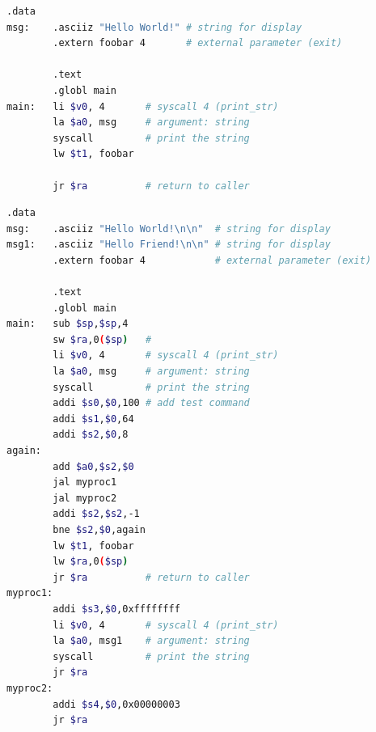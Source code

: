 \documentclass[11pt]{SEU-Digital-Report}
\begin{document}
      \begin{lstlisting}[language=sh,tabsize=4,morekeywords={
        j,la,li,syscall,move,sll,sub,bge,sll,add,sw,addi,jal,ls,subu,jr,lw,bgt,bne
      },title={HelloWorld.s}]
        .data
msg:    .asciiz "Hello World!" # string for display
        .extern foobar 4       # external parameter (exit)

        .text
        .globl main
main:   li $v0, 4       # syscall 4 (print_str)
        la $a0, msg     # argument: string
        syscall         # print the string
        lw $t1, foobar
        
        jr $ra          # return to caller
      \end{lstlisting}

            \begin{lstlisting}[language=sh,tabsize=4,morekeywords={
        j,la,li,syscall,move,sll,sub,bge,sll,add,sw,addi,jal,ls,subu,jr,lw,bgt,bne,lbu,lb,sb
      },title={HelloWorld2.s}]
        .data
msg:    .asciiz "Hello World!\n\n"  # string for display
msg1:   .asciiz "Hello Friend!\n\n" # string for display
        .extern foobar 4            # external parameter (exit)

        .text
        .globl main
main:   sub $sp,$sp,4
        sw $ra,0($sp)   #
        li $v0, 4       # syscall 4 (print_str)
        la $a0, msg     # argument: string
        syscall         # print the string
        addi $s0,$0,100 # add test command
        addi $s1,$0,64
        addi $s2,$0,8
again:
        add $a0,$s2,$0
        jal myproc1
        jal myproc2
        addi $s2,$s2,-1
        bne $s2,$0,again
        lw $t1, foobar
        lw $ra,0($sp)
        jr $ra          # return to caller
myproc1:
        addi $s3,$0,0xffffffff
        li $v0, 4       # syscall 4 (print_str)
        la $a0, msg1    # argument: string
        syscall         # print the string
        jr $ra
myproc2:
        addi $s4,$0,0x00000003
        jr $ra
      \end{lstlisting}
\end{document}
